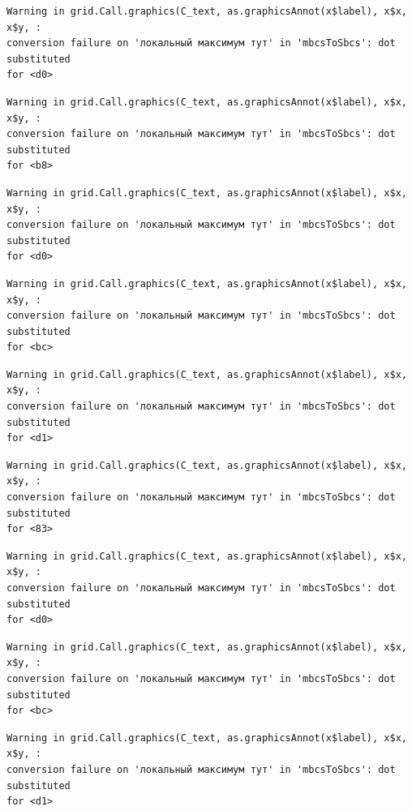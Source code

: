 \documentclass[
  letterpaper,
]{scrbook}
\theoremstyle{definition}
\theoremstyle{remark}
\begin{document}
\begin{verbatim}
Warning in grid.Call.graphics(C_text, as.graphicsAnnot(x$label), x$x, x$y, :
conversion failure on 'локальный максимум тут' in 'mbcsToSbcs': dot substituted
for <d0>
\end{verbatim}

\begin{verbatim}
Warning in grid.Call.graphics(C_text, as.graphicsAnnot(x$label), x$x, x$y, :
conversion failure on 'локальный максимум тут' in 'mbcsToSbcs': dot substituted
for <b8>
\end{verbatim}

\begin{verbatim}
Warning in grid.Call.graphics(C_text, as.graphicsAnnot(x$label), x$x, x$y, :
conversion failure on 'локальный максимум тут' in 'mbcsToSbcs': dot substituted
for <d0>
\end{verbatim}

\begin{verbatim}
Warning in grid.Call.graphics(C_text, as.graphicsAnnot(x$label), x$x, x$y, :
conversion failure on 'локальный максимум тут' in 'mbcsToSbcs': dot substituted
for <bc>
\end{verbatim}

\begin{verbatim}
Warning in grid.Call.graphics(C_text, as.graphicsAnnot(x$label), x$x, x$y, :
conversion failure on 'локальный максимум тут' in 'mbcsToSbcs': dot substituted
for <d1>
\end{verbatim}

\begin{verbatim}
Warning in grid.Call.graphics(C_text, as.graphicsAnnot(x$label), x$x, x$y, :
conversion failure on 'локальный максимум тут' in 'mbcsToSbcs': dot substituted
for <83>
\end{verbatim}

\begin{verbatim}
Warning in grid.Call.graphics(C_text, as.graphicsAnnot(x$label), x$x, x$y, :
conversion failure on 'локальный максимум тут' in 'mbcsToSbcs': dot substituted
for <d0>
\end{verbatim}

\begin{verbatim}
Warning in grid.Call.graphics(C_text, as.graphicsAnnot(x$label), x$x, x$y, :
conversion failure on 'локальный максимум тут' in 'mbcsToSbcs': dot substituted
for <bc>
\end{verbatim}

\begin{verbatim}
Warning in grid.Call.graphics(C_text, as.graphicsAnnot(x$label), x$x, x$y, :
conversion failure on 'локальный максимум тут' in 'mbcsToSbcs': dot substituted
for <d1>
\end{verbatim}
\end{document}
